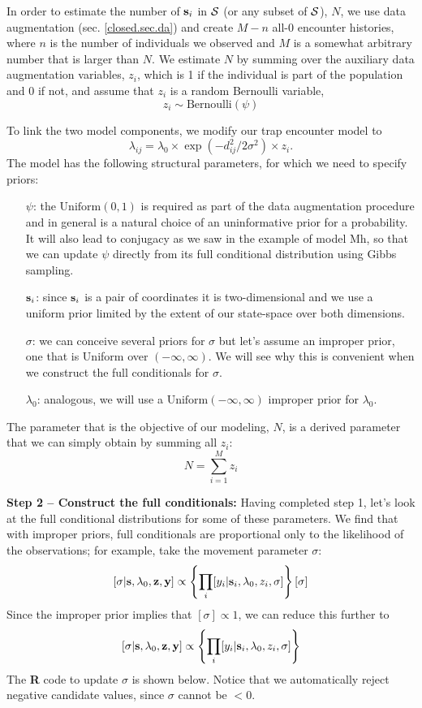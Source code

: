 In order to estimate the number of ${\bf s}_i$ in ${\cal S}$ (or any
subset of ${\cal S}$), $N$, we use data augmentation (sec. \ref{closed.sec.da}) and create $M-n$ all-0 encounter histories, where $n$ is the number of individuals we observed and $M$ is a somewhat arbitrary number that is larger than $N$. We estimate $N$ by summing over the auxiliary data augmentation variables, $z_i$, which is 1 if the individual is part of the population and 0 if not, and assume that $z_i$ is a random Bernoulli variable,
\[
z_{i} \sim \mbox{Bernoulli}(\psi)
\]

To link the two model components, we modify our trap encounter model to
\[
\lambda_{ij} = \lambda_0 \times \exp(-d_{ij}^2/2\sigma^2) \times z_{i}.
\]
The model has the following structural parameters, for which we need to specify priors:
\begin{itemize}
\item[ $\psi$:] the $\mbox{Uniform}(0,1)$ is required as part of the data augmentation procedure and in general is a natural choice of an uninformative prior for a probability. It will also lead to conjugacy as we saw in the example of model Mh, so that we can update $\psi$ directly from its full conditional distribution using Gibbs sampling.
\item[ ${\bf s}_{i}$:] since ${\bf s}_{i}$ is a pair of coordinates it is two-dimensional and we use a uniform prior limited by the extent of our state-space over both dimensions.
\item[ $\sigma$:] we can conceive several priors for $\sigma$ but let's assume an improper prior, one that is Uniform over $(-\infty, \infty)$. We will see why this is convenient when we construct the full conditionals for $\sigma$.
\item[ $\lambda_{0}$:] analogous, we will use a $\mbox{Uniform}(-\infty, \infty)$ improper prior for $\lambda_{0}$.
\end{itemize}
The parameter that is the objective of our modeling, $N$, is a derived parameter that we can simply obtain by summing all $z_i$:
\[
N = \sum_{i=1}^{M} z_{i}
\]

{\bf Step 2 -- Construct the full conditionals:}
Having completed step 1, let's look at the full conditional distributions for some of these parameters.
We find that with improper priors, full conditionals are proportional only to the likelihood of the observations; for example, take the movement parameter $\sigma$:
\[
[\sigma|{\bf s}, \lambda_{0}, {\bf z}, {\bf y}] \propto \left\{ \prod_{i} [y_{i}| {\bf
    s}_{i}, \lambda_{0}, z_{i}, \sigma] \right\}  [\sigma]
\]
Since the improper prior implies that $[\sigma] \propto 1$, we can reduce this further to
\[
[\sigma|{\bf s}, \lambda_{0}, {\bf z}, {\bf y}] \propto \left\{
  \prod_{i} [y_{i}| {\bf s}_{i}, \lambda_{0}, z_{i}, \sigma] \right\}
\]
The {\bf R} code to update $\sigma$ is shown below.
Notice that we automatically reject negative candidate values, since $\sigma$ cannot be $<0$.  

